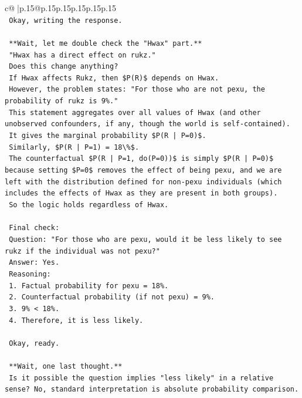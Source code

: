 \documentclass{article}
\begin{document}
{\begin{supertabular}{c@{$\;$}|p{.15\linewidth}@{}p{.15\linewidth}p{.15\linewidth}p{.15\linewidth}p{.15\linewidth}p{.15\linewidth}}
{{{\\ 
\texttt{    Okay, writing the response.} \\
\\ 
\texttt{    **Wait, let me double check the "Hwax" part.**} \\
\texttt{    "Hwax has a direct effect on rukz."} \\
\texttt{    Does this change anything?} \\
\texttt{    If Hwax affects Rukz, then \$P(R)\$ depends on Hwax.} \\
\texttt{    However, the problem states: "For those who are not pexu, the probability of rukz is 9\%."} \\
\texttt{    This statement aggregates over all values of Hwax (and other unobserved confounders, if any, though the world is self{-}contained).} \\
\texttt{    It gives the marginal probability \$P(R | P=0)\$.} \\
\texttt{    Similarly, \$P(R | P=1) = 18\textbackslash{}\%\$.} \\
\texttt{    The counterfactual \$P(R | P=1, do(P=0))\$ is simply \$P(R | P=0)\$ because setting \$P=0\$ removes the effect of being pexu, and we are left with the distribution defined for non{-}pexu individuals (which includes the effects of Hwax as they are present in both groups).} \\
\texttt{    So the logic holds regardless of Hwax.} \\
\\ 
\texttt{    Final check:} \\
\texttt{    Question: "For those who are pexu, would it be less likely to see rukz if the individual was not pexu?"} \\
\texttt{    Answer: Yes.} \\
\texttt{    Reasoning:} \\
\texttt{    1. Factual probability for pexu = 18\%.} \\
\texttt{    2. Counterfactual probability (if not pexu) = 9\%.} \\
\texttt{    3. 9\% < 18\%.} \\
\texttt{    4. Therefore, it is less likely.} \\
\\ 
\texttt{    Okay, ready.} \\
\\ 
\texttt{    **Wait, one last thought.**} \\
\texttt{    Is it possible the question implies "less likely" in a relative sense? No, standard interpretation is absolute probability comparison.} \\
}}}
\end{supertabular}}
\end{document}
